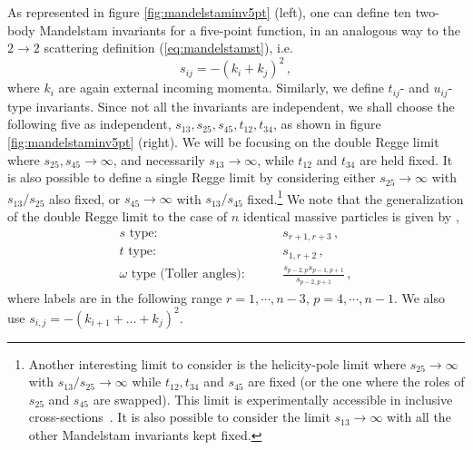 As represented in figure \ref{fig:mandelstaminv5pt} (left), one can define  ten two-body Mandelstam invariants for a five-point function,
in an analogous way to the $2 \to 2$ scattering definition (\ref{eq:mandelstamst}), i.e.
\begin{equation}
  s_{ij}=-(k_i+k_j)^2\,,
\end{equation}
where $k_i$ are again external incoming momenta. Similarly, we define $t_{ij}$- and $u_{ij}$-type invariants.
Since not all the invariants are independent, we shall choose
the following five as independent, $s_{13},s_{25},s_{45},t_{12},t_{34}$, as shown in figure \ref{fig:mandelstaminv5pt} (right).
We will be focusing on the double Regge limit where $s_{25}, s_{45}\to \infty$, and necessarily $s_{13}\to \infty$, while $t_{12}$ and $t_{34}$ are held fixed.
It is also possible to define a single Regge limit by considering either $s_{25}\to \infty$ with $s_{13}/s_{25}$ also fixed, or $s_{45}\to \infty$ with $s_{13}/s_{45}$ fixed.\footnote{Another interesting limit to consider is the helicity-pole limit where $s_{25}\to \infty$ with $s_{13}/s_{25}\to \infty$ while $t_{12}, t_{34}$ and $s_{45}$ are fixed (or the one where  the roles of $s_{25}$ and $s_{45}$ are swapped). This limit is experimentally accessible in inclusive cross-sections~\cite{PhysRevLett.26.675}. It is also possible to consider the limit $s_{13}\to \infty$ with all the other Mandelstam invariants kept fixed.}
We note that the generalization of the double Regge limit to the case of $n$ identical massive particles is given by
\cite{Brower:1974yv},
\begin{align}
 s \text{ type}:                       & \qquad s_{r+1,r+3} \,,                                     \\
 t \text{ type}:                       & \qquad      s_{1,r+2} \,,                                  \\
 \omega \text{ type (Toller angles)} : & \qquad   \frac{s_{p-2,p} s_{p-1,p+1}}{s_{p-2,p+1}} \,,
 \nonumber
\end{align}
where labels are in the following range $    r          =1,\cdots,n-3                                    ,\, p          =4,\cdots,n-1 $.
We also use $ s_{i,j}=-\left( k_{i+1}+\dots+k_j \right)^2 $.

